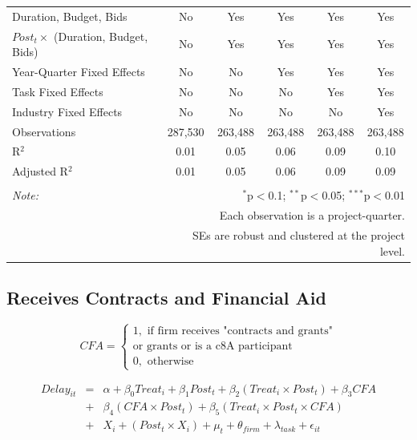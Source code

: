 \documentclass[
]{article}
\begin{document}
\begin{table}[H]
\begin{tabular}{@{\extracolsep{-2pt}}lccccc}
Duration, Budget, Bids & No & Yes & Yes & Yes & Yes \\ 
$Post_t \times $  (Duration, Budget, Bids) & No & Yes & Yes & Yes & Yes \\ 
Year-Quarter Fixed Effects & No & No & Yes & Yes & Yes \\ 
Task Fixed Effects & No & No & No & Yes & Yes \\ 
Industry Fixed Effects & No & No & No & No & Yes \\ 
Observations & 287,530 & 263,488 & 263,488 & 263,488 & 263,488 \\ 
R$^{2}$ & 0.01 & 0.05 & 0.06 & 0.09 & 0.10 \\ 
Adjusted R$^{2}$ & 0.01 & 0.05 & 0.06 & 0.09 & 0.09 \\ 
\hline 
\hline \\[-1.8ex] 
\textit{Note:}  & \multicolumn{5}{r}{$^{*}$p$<$0.1; $^{**}$p$<$0.05; $^{***}$p$<$0.01} \\ 
 & \multicolumn{5}{r}{Each observation is a project-quarter.} \\ 
 & \multicolumn{5}{r}{SEs are robust and clustered at the project level.} \\ 
\end{tabular} 
\end{table}

\hypertarget{receives-contracts-and-financial-aid}{%
\subsection{Receives Contracts and Financial
Aid}\label{receives-contracts-and-financial-aid}}

\[ CFA = \begin{cases} 1, \text{ if firm receives "contracts and grants"}\\ 
                       \text{or grants or is a c8A participant}\\
0, \text{ otherwise} \end{cases}\]

\[ \begin{aligned}
Delay_{it} &=& \alpha+\beta_0 Treat_i + \beta_1 Post_t + \beta_2 (Treat_i \times Post_t) +\beta_3 CFA \\
&+& \beta_4 (CFA \times Post_t) + \beta_5 (Treat_i \times Post_t \times CFA) \\ 
&+&X_i + (Post_t \times X_i) + \mu_t + \theta_{firm} + \lambda_{task}+ \epsilon_{it}
\end{aligned}\]
\end{document}
